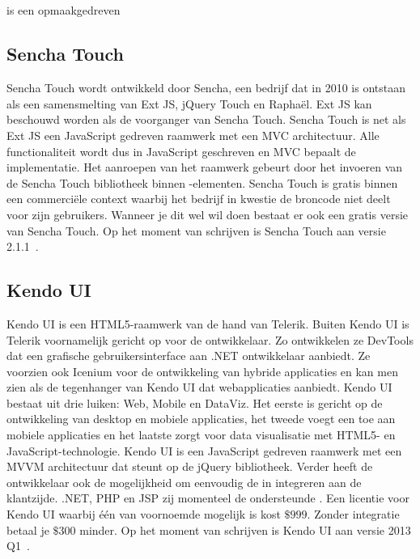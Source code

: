 \subsection{\jqm} %
\jqm{} is een opmaakgedreven 

\subsection{Sencha Touch}%
Sencha Touch wordt ontwikkeld door Sencha,  een bedrijf dat in 2010 is ontstaan als een samensmelting van Ext JS,  jQuery Touch en Raphaël.
Ext JS kan beschouwd worden als de voorganger van Sencha Touch. 
Sencha Touch is net als Ext JS een JavaScript gedreven raamwerk met een MVC architectuur.
Alle functionaliteit wordt dus in JavaScript geschreven en MVC bepaalt de implementatie.
Het aanroepen van het raamwerk gebeurt door het invoeren van de Sencha Touch bibliotheek binnen -elementen.
Sencha Touch is gratis binnen een commerciële context waarbij het bedrijf in kwestie de broncode niet deelt voor zijn gebruikers.  
Wanneer je dit wel wil doen bestaat er ook een gratis  versie van Sencha Touch.
Op het moment van schrijven is Sencha Touch aan versie 2.1.1~\cite{Inc.}. 

\subsection{Kendo UI} %
Kendo UI is een HTML5-raamwerk van de hand van Telerik.
Buiten Kendo UI is Telerik voornamelijk gericht op  voor de ontwikkelaar.
Zo ontwikkelen ze DevTools dat een grafische gebruikersinterface aan .NET ontwikkelaar aanbiedt.
Ze voorzien ook Icenium voor de ontwikkeling van hybride applicaties en kan men zien als de tegenhanger van Kendo UI dat webapplicaties aanbiedt.
Kendo UI bestaat uit drie luiken:  Web, Mobile en DataViz.  
Het eerste is gericht op de ontwikkeling van desktop en mobiele applicaties,  het tweede voegt een  toe aan mobiele applicaties en het laatste zorgt voor data visualisatie met HTML5- en JavaScript-technologie.
Kendo UI is een JavaScript gedreven raamwerk met een MVVM architectuur dat steunt op de jQuery bibliotheek.
Verder heeft de ontwikkelaar ook de mogelijkheid om eenvoudig de  in integreren aan de klantzijde.
.NET,  PHP en JSP zij momenteel de ondersteunde .
Een licentie voor Kendo UI waarbij één van voornoemde  mogelijk is kost $\$999$.
Zonder  integratie betaal je $\$300$ minder.
Op het moment van schrijven is Kendo UI aan versie 2013 Q1~\cite{Telerik}. 


